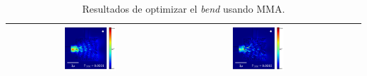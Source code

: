 \begin{table}[ht]
\begin{tabular}{|c|c|c|c|}
      \includegraphics[width=0.33\textwidth]{image/results/bend/MMA/visualize_field_disc_512.png} &
      \includegraphics[width=0.33\textwidth]{image/results/bend/MMA/visualize_field_fab_512.png} \\
    \hline
    \end{tabular}
    \hspace*{-3cm}
    \caption{Resultados de optimizar el \emph{bend} usando MMA.}
    \label{tab:opt-MMA-bend}
\end{table}

